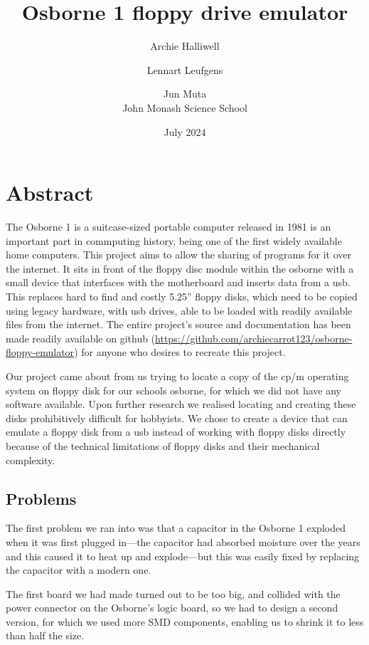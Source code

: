 \documentclass[a4paper]{article}
\begin{document}
\title{Osborne 1 floppy drive emulator}
\date{July 2024}
\author{Archie Halliwell \and Lennart Leufgens \and Jun Muta \\
John Monash Science School}
\maketitle

\section{Abstract}

The Osborne 1 is a suitcase-sized portable computer released in 1981
is an important part in commputing history, being one of the first
widely available home computers. This project aims to allow the
sharing of programs for it over the internet. It sits in front of the
floppy disc module within the osborne with a small device that
interfaces with the motherboard and inserts data from a usb. This
replaces hard to find and costly 5.25'' floppy disks, which need to be
copied using legacy hardware, with usb drives, able to be loaded with
readily available files from the internet. The entire project's source
and documentation has been made readily available on github
(\url{https://github.com/archiecarrot123/osborne-floppy-emulator}) for
anyone who desires to recreate this project.

Our project came about from us trying to locate a copy of the cp/m
operating system on floppy disk for our schools osborne, for which we
did not have any software available. Upon further research we realised
locating and creating these disks prohibitively difficult for
hobbyists. We chose to create a device that can emulate a floppy disk
from a usb instead of working with floppy disks directly because of
the technical limitations of floppy disks and their mechanical
complexity. 

\subsection{Problems}

The first problem we ran into was that a capacitor in the Osborne 1
exploded when it was first plugged in---the capacitor had absorbed
moisture over the years and this caused it to heat up and
explode---but this was easily fixed by replacing the capacitor with a
modern one.

The first board we had made turned out to be too big, and collided with
the power connector on the Osborne's logic board, so we had to design a second
version, for which we used more SMD components, enabling us to shrink
it to less than half the size.
\end{document}

